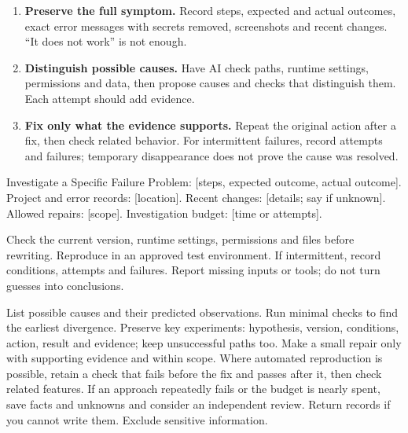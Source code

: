 \begin{enumerate}
\item \textbf{Preserve the full symptom.} Record steps, expected and actual outcomes, exact error messages with secrets removed, screenshots and recent changes. ``It does not work'' is not enough.
\item \textbf{Distinguish possible causes.} Have AI check paths, runtime settings, permissions and data, then propose causes and checks that distinguish them. Each attempt should add evidence.
\item \textbf{Fix only what the evidence supports.} Repeat the original action after a fix, then check related behavior. For intermittent failures, record attempts and failures; temporary disappearance does not prove the cause was resolved.
\end{enumerate}
\begin{prompt}{Investigate a Specific Failure}
Problem: [steps, expected outcome, actual outcome]. Project and error records: [location]. Recent changes: [details; say if unknown]. Allowed repairs: [scope]. Investigation budget: [time or attempts].\par
Check the current version, runtime settings, permissions and files before rewriting. Reproduce in an approved test environment. If intermittent, record conditions, attempts and failures. Report missing inputs or tools; do not turn guesses into conclusions.\par
List possible causes and their predicted observations. Run minimal checks to find the earliest divergence. Preserve key experiments: hypothesis, version, conditions, action, result and evidence; keep unsuccessful paths too. Make a small repair only with supporting evidence and within scope. Where automated reproduction is possible, retain a check that fails before the fix and passes after it, then check related features. If an approach repeatedly fails or the budget is nearly spent, save facts and unknowns and consider an independent review. Return records if you cannot write them. Exclude sensitive information.
\end{prompt}
